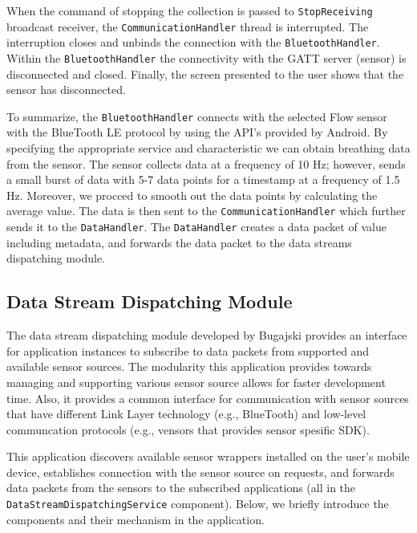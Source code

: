 When the command of stopping the collection is passed to \verb|StopReceiving| broadcast receiver, the \verb|CommunicationHandler| thread is interrupted. The interruption closes and unbinds the connection with the \verb|BluetoothHandler|. Within the \verb|BluetoothHandler| the connectivity with the GATT server (sensor) is disconnected and closed. Finally, the screen presented to the user shows that the sensor has disconnected.

To summarize, the \verb|BluetoothHandler| connects with the selected Flow sensor with the BlueTooth LE protocol by using the API's provided by Android. By specifying the appropriate service and characteristic we can obtain breathing data from the sensor. The sensor collects data at a frequency of 10 Hz; however, sends a small burst of data with 5-7 data points for a timestamp at a frequency of 1.5 Hz. Moreover, we procced to smooth out the data points by calculating the average value. The data is then sent to the \verb|CommunicationHandler| which further sends it to the \verb|DataHandler|. The \verb|DataHandler| creates a data packet of value including metadata, and forwards the data packet to the data streams dispatching module.  


\subsection{Data Stream Dispatching Module}\label{imp:dsdm}
The data stream dispatching module developed by Bugajski provides an interface for application instances to subscribe to data packets from supported and available sensor sources. The modularity this application provides towards managing and supporting various sensor source allows for faster development time. Also, it provides a common interface for communication with sensor sources that have different Link Layer technology (e.g., BlueTooth) and low-level communcation protocols (e.g., vensors that provides sensor spesific SDK). 

This application discovers available sensor wrappers installed on the user's mobile device, establishes connection with the sensor source on requests, and forwards data packets from the sensors to the subscribed applications (all in the \verb|DataStreamDispatchingService| component). Below, we briefly introduce the components and their mechanism in the application.

